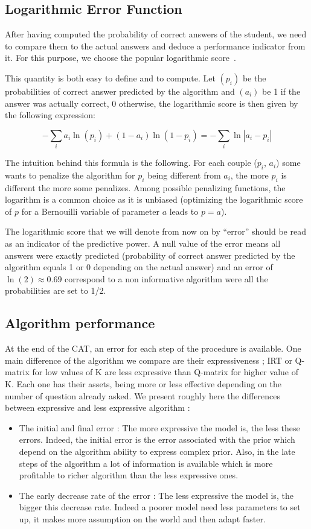 \documentclass{sig-alternate}
\begin{document}
\subsection{Logarithmic Error Function}

After having computed the probability of correct answers of the student, we need to compare them to the actual answers and deduce a performance indicator from it. For this purpose, we choose the popular logarithmic score~\citep{Gneiting2007}. 

This quantity is both easy to define and to compute. Let $(p_i)$ be the probabilities of correct answer predicted by the algorithm and $(a_i)$ be 1 if the answer was actually correct, 0 otherwise, the logarithmic score is then given by the following expression: 

\[ - \sum_i a_i\ln(p_i) + (1-a_i)\ln(1-p_i) = - \sum_i \ln | a_i - p_i | \]

The intuition behind this formula is the following. For each couple ($p_i$, $a_i$) some wants to penalize the algorithm for $p_i$ being different from $a_i$, the more $p_i$ is different the more some penalizes. Among possible penalizing functions, the logarithm is a common choice as it is unbiased (optimizing the logarithmic score of $p$ for a Bernouilli variable of parameter $a$ leads to $p=a$). 

The logarithmic score that we will denote from now on by ``error'' should be read as an indicator of the predictive power. A null value of the error means all answers were exactly predicted (probability of correct answer predicted by the algorithm equals 1 or 0 depending on the actual answer) and an error of $\ln(2) \approx 0.69$ correspond to a non informative algorithm were all the probabilities are set to 1/2. 

\subsection{Algorithm performance}

At the end of the CAT, an error for each step of the procedure is available. One main difference of the algorithm we compare are their expressiveness ; IRT or Q-matrix for low values of K are less expressive than Q-matrix for higher value of K. Each one has their assets, being more or less effective depending on the number of question already asked. We present roughly here the differences between expressive and less expressive algorithm : 
\begin{itemize}
\item The initial and final error : The more expressive the model is, the less these errors. Indeed, the initial error is the error associated with the prior which depend on the algorithm ability to express complex prior. Also, in the late steps of the algorithm a lot of information is available which is more profitable to richer algorithm than the less expressive ones. 
\item The early decrease rate of the error : The less expressive the model is, the bigger this decrease rate. Indeed a poorer model need less parameters to set up, it makes more assumption on the world and then adapt faster. 
\end{itemize}
\end{document}
